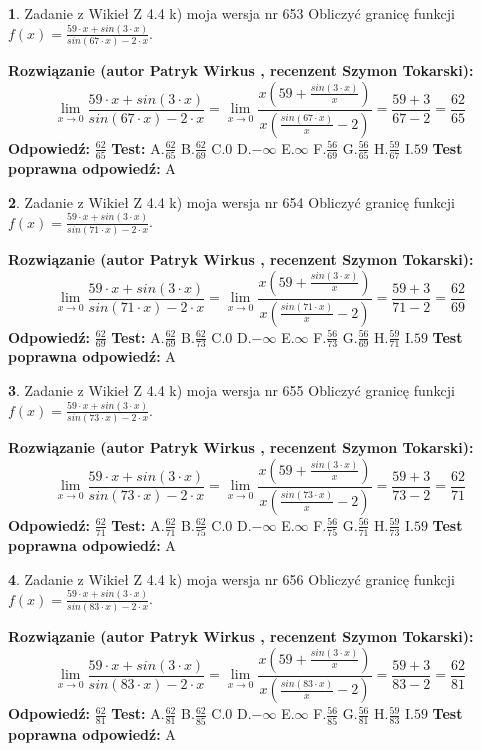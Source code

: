 \documentclass[12pt, a4paper]{article}
\theoremstyle{definition} %
\newtheorem{zad}{}
\newcommand{\zadStart}[1]{\begin{zad}#1\newline}
\newcommand{\zadStop}{\end{zad}}
\newcommand{\rozwStart}[2]{\noindent \textbf{Rozwiązanie (autor #1 , recenzent #2): }\newline}
\newcommand{\rozwStop}{\newline}
\newcommand{\odpStart}{\noindent \textbf{Odpowiedź:}\newline}
\newcommand{\odpStop}{\newline}
\newcommand{\testStart}{\noindent \textbf{Test:}\newline}
\newcommand{\testStop}{\newline}
\newcommand{\kluczStart}{\noindent \textbf{Test poprawna odpowiedź:}\newline}
\newcommand{\kluczStop}{\newline}
\begin{document}
\zadStart{Zadanie z Wikieł Z 4.4 k) moja wersja nr 653}
Obliczyć granicę funkcji $f(x)=\frac{59\cdot x +sin(3\cdot x)}{sin(67\cdot x) -2\cdot x}$.
\zadStop
\rozwStart{Patryk Wirkus}{Szymon Tokarski}
$$\lim\limits_{x\to 0}\frac{59\cdot x +sin(3\cdot x)}{sin(67\cdot x) -2\cdot x}
=\lim\limits_{x\to 0}\frac{x(59+\frac{sin(3\cdot x)}{x})}{x(\frac{sin(67\cdot x)}{x}-2)}
=\frac{59+3}{67-2} = \frac{62}{65}$$
\rozwStop
\odpStart
$\frac{62}{65}$
\odpStop
\testStart
A.$\frac{62}{65}$
B.$\frac{62}{69}$
C.$0$
D.$-\infty$
E.$\infty$
F.$\frac{56}{69}$
G.$\frac{56}{65}$
H.$\frac{59}{67}$
I.$59$
\testStop
\kluczStart
A
\kluczStop



\zadStart{Zadanie z Wikieł Z 4.4 k) moja wersja nr 654}
Obliczyć granicę funkcji $f(x)=\frac{59\cdot x +sin(3\cdot x)}{sin(71\cdot x) -2\cdot x}$.
\zadStop
\rozwStart{Patryk Wirkus}{Szymon Tokarski}
$$\lim\limits_{x\to 0}\frac{59\cdot x +sin(3\cdot x)}{sin(71\cdot x) -2\cdot x}
=\lim\limits_{x\to 0}\frac{x(59+\frac{sin(3\cdot x)}{x})}{x(\frac{sin(71\cdot x)}{x}-2)}
=\frac{59+3}{71-2} = \frac{62}{69}$$
\rozwStop
\odpStart
$\frac{62}{69}$
\odpStop
\testStart
A.$\frac{62}{69}$
B.$\frac{62}{73}$
C.$0$
D.$-\infty$
E.$\infty$
F.$\frac{56}{73}$
G.$\frac{56}{69}$
H.$\frac{59}{71}$
I.$59$
\testStop
\kluczStart
A
\kluczStop



\zadStart{Zadanie z Wikieł Z 4.4 k) moja wersja nr 655}
Obliczyć granicę funkcji $f(x)=\frac{59\cdot x +sin(3\cdot x)}{sin(73\cdot x) -2\cdot x}$.
\zadStop
\rozwStart{Patryk Wirkus}{Szymon Tokarski}
$$\lim\limits_{x\to 0}\frac{59\cdot x +sin(3\cdot x)}{sin(73\cdot x) -2\cdot x}
=\lim\limits_{x\to 0}\frac{x(59+\frac{sin(3\cdot x)}{x})}{x(\frac{sin(73\cdot x)}{x}-2)}
=\frac{59+3}{73-2} = \frac{62}{71}$$
\rozwStop
\odpStart
$\frac{62}{71}$
\odpStop
\testStart
A.$\frac{62}{71}$
B.$\frac{62}{75}$
C.$0$
D.$-\infty$
E.$\infty$
F.$\frac{56}{75}$
G.$\frac{56}{71}$
H.$\frac{59}{73}$
I.$59$
\testStop
\kluczStart
A
\kluczStop



\zadStart{Zadanie z Wikieł Z 4.4 k) moja wersja nr 656}
Obliczyć granicę funkcji $f(x)=\frac{59\cdot x +sin(3\cdot x)}{sin(83\cdot x) -2\cdot x}$.
\zadStop
\rozwStart{Patryk Wirkus}{Szymon Tokarski}
$$\lim\limits_{x\to 0}\frac{59\cdot x +sin(3\cdot x)}{sin(83\cdot x) -2\cdot x}
=\lim\limits_{x\to 0}\frac{x(59+\frac{sin(3\cdot x)}{x})}{x(\frac{sin(83\cdot x)}{x}-2)}
=\frac{59+3}{83-2} = \frac{62}{81}$$
\rozwStop
\odpStart
$\frac{62}{81}$
\odpStop
\testStart
A.$\frac{62}{81}$
B.$\frac{62}{85}$
C.$0$
D.$-\infty$
E.$\infty$
F.$\frac{56}{85}$
G.$\frac{56}{81}$
H.$\frac{59}{83}$
I.$59$
\testStop
\kluczStart
A
\kluczStop
\end{document}
